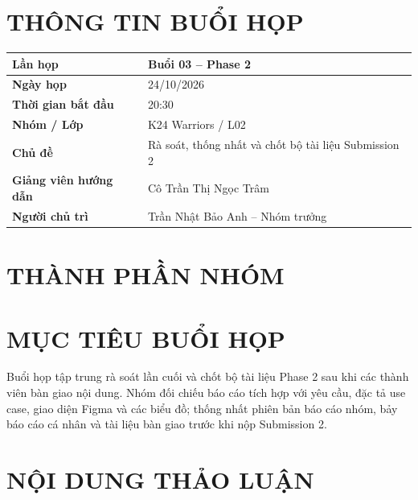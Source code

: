 \documentclass[10pt,a4paper]{article}
\begin{document}
\MakeHCMUTCover

\section{THÔNG TIN BUỔI HỌP}
\begin{center}
\begin{tabularx}{\textwidth}{|>{\bfseries}L{43mm}|Y|}
  \hline
  Lần họp & Buổi 03 -- Phase 2\\\hline
  Ngày họp & 24/10/2026\\\hline
  Thời gian bắt đầu & 20:30\\\hline
  Nhóm / Lớp & K24 Warriors / L02\\\hline
  Chủ đề & Rà soát, thống nhất và chốt bộ tài liệu Submission 2\\\hline
  Giảng viên hướng dẫn & Cô Trần Thị Ngọc Trâm\\\hline
  Người chủ trì & Trần Nhật Bảo Anh -- Nhóm trưởng\\\hline
\end{tabularx}
\end{center}

\section{THÀNH PHẦN NHÓM}
\begin{HCMUTMemberTable}
\end{HCMUTMemberTable}

\section{MỤC TIÊU BUỔI HỌP}
Buổi họp tập trung rà soát lần cuối và chốt bộ tài liệu Phase 2 sau khi các thành viên bàn giao nội dung. Nhóm đối chiếu báo cáo tích hợp với yêu cầu, đặc tả use case, giao diện Figma và các biểu đồ; thống nhất phiên bản báo cáo nhóm, bảy báo cáo cá nhân và tài liệu bàn giao trước khi nộp Submission 2.

\section{NỘI DUNG THẢO LUẬN}
\end{document}
